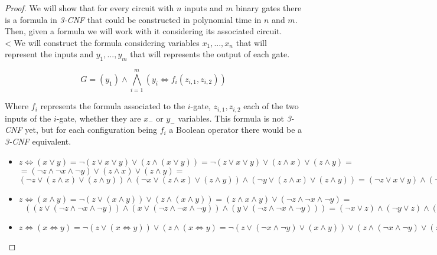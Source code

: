     \begin{proof}
      We will show that for every circuit with $n$ inputs and $m$ binary gates there is a formula in \emph{3-CNF}  that could be constructed in polynomial time in $n$ and $m$. Then, given a formula we will work with it considering its associated circuit.\\
<
      We will construct the formula considering variables $x_1,...,x_n$ that will represent the inputs and $y_1,...,y_m$ that will represents the output of each gate. 

      $$ G = (y_1) \wedge \bigwedge_{i=1}^m (y_i \iff f_i(z_{i,1},z_{i,2}))$$

      Where $f_i$ represents the formula associated to the $i$-gate, $z_{i,1},z_{i,2}$ each of the two inputs of the $i$-gate, whether they are $x_-$ or $y_-$ variables. This formula is not \emph{3-CNF} yet, but for each configuration being $f_i$ a Boolean operator there would be a \emph{3-CNF} equivalent.

      \begin{itemize}
      \item $z \iff( x \vee y )  = \neg  ( z \vee  x \vee y    ) \vee (z \wedge ( x \vee y )  ) = \neg  ( z \vee  x \vee y    ) \vee (z \wedge x)  \vee (z \wedge y ) =$\\$= ( \neg  z \wedge  \neg  x \wedge \neg   y    ) \vee (z \wedge x)  \vee (z \wedge y )  =$$
        (\neg  z \vee (z \wedge x)  \vee (z \wedge y ))  \wedge  
        (\neg  x \vee (z \wedge x)  \vee (z \wedge y )) \wedge
        (\neg  y \vee (z \wedge x)  \vee (z \wedge y ))   =
        (\neg  z \vee x  \vee y )  \wedge  
        (\neg  x \vee z  ) \wedge
        (\neg  y \vee z ) $   
      \item $z \iff( x \wedge y ) = \neg ( z \vee ( x \wedge y )) \vee (z \wedge ( x \wedge y )) = (z\wedge x \wedge y ) \vee  (\neg  z\wedge \neg  x \wedge \neg  y )  =$\\$\ \ \ ((z\vee  (\neg  z\wedge \neg  x \wedge \neg  y )  ) \wedge (x \vee  (\neg  z\wedge \neg  x \wedge \neg  y )  ) \wedge (y\vee  (\neg  z\wedge \neg  x \wedge \neg  y )  ) ) = (\neg  x \vee z) \wedge (\neg  y \vee z ) \wedge (\neg  z \vee x ) \wedge (\neg  y \vee x ) \wedge(\neg  z\vee y )\wedge (\neg  x\vee y )$
	
      \item $z \iff( x \iff y ) =  \neg ( z \vee ( x \iff y ) ) \vee (z \wedge ( x \iff y ) = \neg ( z \vee (\neg  x \wedge \neg  y) \vee (x \wedge y)) \vee (z \wedge(\neg  x \wedge \neg  y) \vee (x \wedge y))  )=(\neg  z \wedge \neg  (\neg  x \wedge \neg  y) \wedge \neg  (x \wedge y)) \vee (z \wedge(\neg  x \wedge \neg  y) \vee (x \wedge y))  )=(\neg  z \wedge  (x \vee  y) \wedge (\neg  x \vee \neg  y)) \vee (z \wedge(\neg  x \wedge \neg  y) \vee (x \wedge y))  )=z \vee ( \neg  x \wedge \neg  y) = (\neg x \vee \neg y \vee z) \wedge (\neg x \vee \neg z \vee y) \wedge (y \vee z \vee x) \wedge (y \vee \neg y \vee x) \wedge (\neg z \vee z \vee x) \wedge (\neg z \vee \neg y \vee x)$
	

\end{itemize}
\end{proof}
